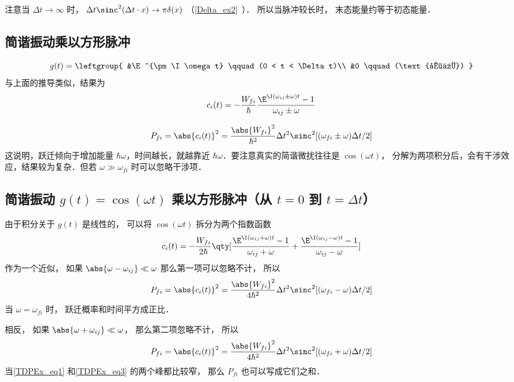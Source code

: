 注意当 $\Delta t \to \infty$ 时， $\Delta t\sinc^2(\Delta t\cdot x) \to \pi\delta(x)$ （\autoref{Delta_ex2}~）． 所以当脉冲较长时， 末态能量约等于初态能量．

\subsection{简谐振动乘以方形脉冲}
\begin{equation}
g(t) = \leftgroup{
&\E^{\pm\I\omega t} \qquad (0 < t < \Delta t)\\
&0 \qquad (\text{其他})
}\end{equation}
与上面的推导类似，结果为
\begin{equation}
c_i(t) = -\frac{W_{fi}}{\hbar} \frac{\E^{\I(\omega_{ij} \pm \omega)t} - 1}{\omega_{ij} \pm \omega}
\end{equation}

\begin{equation}
P_{fi} = \abs{c_i(t)}^2 = \frac{\abs{W_{fi}}^2}{\hbar^2} \Delta t^2 \sinc^2[(\omega_{fi}\pm\omega)\Delta t/2]
\end{equation}
这说明，跃迁倾向于增加能量 $\hbar\omega$，时间越长，就越靠近 $\hbar\omega$．要注意真实的简谐微扰往往是 $\cos(\omega t)$， 分解为两项积分后，会有干涉效应，结果较为复杂．但若 $\omega \gg \omega_{fi}$ 时可以忽略干涉项．

\subsection{简谐振动 $g(t)= \cos(\omega t)$ 乘以方形脉冲（从 $t=0$ 到 $t=\Delta t$）}
由于积分关于 $g(t)$ 是线性的， 可以将 $\cos(\omega t)$ 拆分为两个指数函数
\begin{equation}
c_i(t) = -\frac{W_{fi}}{2\hbar} \qty[\frac{\E^{\I(\omega_{ij} + \omega)t} - 1}{\omega_{ij} + \omega} + \frac{\E^{\I(\omega_{ij} - \omega)t} - 1}{\omega_{ij} - \omega}]
\end{equation}
作为一个近似， 如果 $\abs{\omega - \omega_{ij}} \ll \omega$ 那么第一项可以忽略不计， 所以
\begin{equation}\label{TDPEx_eq1}
P_{fi} = \abs{c_i(t)}^2 = \frac{\abs{W_{fi}}^2}{4\hbar^2} \Delta t^2 \sinc^2[(\omega_{fi}-\omega)\Delta t/2]
\end{equation}
当 $\omega = \omega_{fi}$ 时， 跃迁概率和时间平方成正比．

相反， 如果 $\abs{\omega + \omega_{ij}} \ll \omega$， 那么第二项忽略不计， 所以
\begin{equation}\label{TDPEx_eq3}
P_{fi} = \abs{c_i(t)}^2 = \frac{\abs{W_{fi}}^2}{4\hbar^2} \Delta t^2 \sinc^2[(\omega_{fi}+\omega)\Delta t/2]
\end{equation}
当\autoref{TDPEx_eq1} 和\autoref{TDPEx_eq3} 的两个峰都比较窄， 那么 $P_{fi}$ 也可以写成它们之和．
